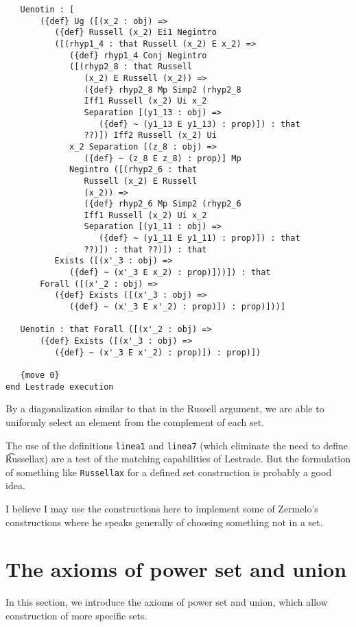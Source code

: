 \documentclass[12pt]{article}
\begin{document}
\begin{verbatim}
   Uenotin : [
       ({def} Ug ([(x_2 : obj) => 
          ({def} Russell (x_2) Ei1 Negintro 
          ([(rhyp1_4 : that Russell (x_2) E x_2) => 
             ({def} rhyp1_4 Conj Negintro 
             ([(rhyp2_8 : that Russell 
                (x_2) E Russell (x_2)) => 
                ({def} rhyp2_8 Mp Simp2 (rhyp2_8 
                Iff1 Russell (x_2) Ui x_2 
                Separation [(y1_13 : obj) => 
                   ({def} ~ (y1_13 E y1_13) : prop)]) : that 
                ??)]) Iff2 Russell (x_2) Ui 
             x_2 Separation [(z_8 : obj) => 
                ({def} ~ (z_8 E z_8) : prop)] Mp 
             Negintro ([(rhyp2_6 : that 
                Russell (x_2) E Russell 
                (x_2)) => 
                ({def} rhyp2_6 Mp Simp2 (rhyp2_6 
                Iff1 Russell (x_2) Ui x_2 
                Separation [(y1_11 : obj) => 
                   ({def} ~ (y1_11 E y1_11) : prop)]) : that 
                ??)]) : that ??)]) : that 
          Exists ([(x'_3 : obj) => 
             ({def} ~ (x'_3 E x_2) : prop)]))]) : that 
       Forall ([(x'_2 : obj) => 
          ({def} Exists ([(x'_3 : obj) => 
             ({def} ~ (x'_3 E x'_2) : prop)]) : prop)]))]

   Uenotin : that Forall ([(x'_2 : obj) => 
       ({def} Exists ([(x'_3 : obj) => 
          ({def} ~ (x'_3 E x'_2) : prop)]) : prop)])

   {move 0}
end Lestrade execution
\end{verbatim}

By a diagonalization similar to that in the Russell argument, we are able to uniformly select an element from the complement of each set.

The use of the definitions {\tt linea1} and {\tt linea7} (which eliminate the need to define {\t Russellax}) are a test of the matching capabilities of Lestrade.  But the formulation of something like {\tt Russellax} for a defined set construction is probably a good idea.

I believe I may use the constructions here to implement some of Zermelo's constructions where he speaks generally of choosing something not in a set.

\section{The axioms of power set and union}

In this section, we introduce the axioms of power set and union, which allow construction of more specific sets.
\end{document}
